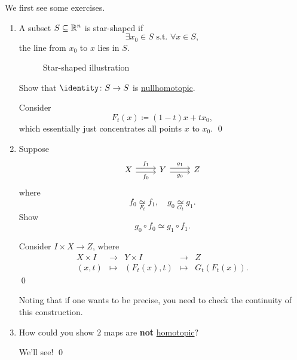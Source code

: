 \begin{exercise}
	We first see some exercises.
	\begin{enumerate}
		\item A subset \(S\subseteq \mathbb{\MakeUppercase{R}} ^n\) is star-shaped if
		      \[
			      \exists x_0\in S \text{ s.t. }\forall x\in S,
		      \]
		      the line from \(x_0\) to \(x\) lies in \(S\).
		      \begin{figure}[H]
			      \centering
			      \caption{Star-shaped illustration}
			      \label{fig:eg:star-shaped}
		      \end{figure}
		      Show that \(\identity\colon S\to S\) is \hyperref[def:nullhomotopic]{nullhomotopic}.

		      \begin{answer}
			      Consider
			      \[
				      F_{t}(x) \coloneqq (1 - t)x+tx_0,
			      \]
			      which essentially just concentrates all points \(x\) to \(x_0\).
			      \qed
		      \end{answer}
		\item Suppose
		      \[\begin{tikzcd}
				      X & Y & Z
				      \arrow["{f_0}"', shift right=1, from=1-1, to=1-2]
				      \arrow["{g_0}"', shift right=1, from=1-2, to=1-3]
				      \arrow["{f_1}", shift left=1, from=1-1, to=1-2]
				      \arrow["{g_1}", shift left=1, from=1-2, to=1-3]
			      \end{tikzcd}\]
		      where
		      \[
			      f_0 \underset{F_{t}}{\simeq} f_1,\quad g_0\underset{G_{t}}{\simeq} g_1.
		      \]
		      Show
		      \[
			      g_0\circ f_0\simeq g_{1}\circ f_1.
		      \]
		      \begin{answer}
			      Consider \(I\times X\to Z\), where
			      \[
				      \begin{array}{ccccc}
					      X \times I & \to     & Y \times I  & \to     & Z                \\
					      (x, t)     & \mapsto & (F_t(x), t) & \mapsto & G_{t}(F_{t}(x)).
				      \end{array}
			      \]
			      \qed
		      \end{answer}
		      \begin{remark}
			      Noting that if one wants to be precise, you need to check the continuity of this construction.
		      \end{remark}
		\item How could you show \(2\) maps are \textbf{not} \hyperref[def:homotopic]{homotopic}?
		      \begin{answer}
			      We'll see!
			      \qed
		      \end{answer}
	\end{enumerate}
\end{exercise}